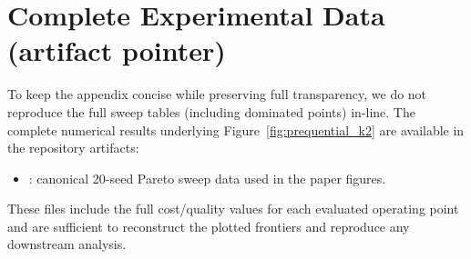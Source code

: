 \section{Complete Experimental Data (artifact pointer)}
\label{appendix:complete_data}

To keep the appendix concise while preserving full transparency, we do not reproduce the full sweep tables (including dominated points) in-line. The complete numerical results underlying Figure~\ref{fig:prequential_k2} are available in the repository artifacts:

\begin{itemize}[nosep]
    \item {}: canonical 20-seed Pareto sweep data used in the paper figures.
\end{itemize}

\noindent These files include the full cost/quality values for each evaluated operating point and are sufficient to reconstruct the plotted frontiers and reproduce any downstream analysis.

